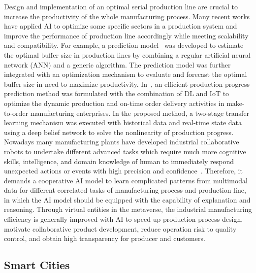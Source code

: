 \documentclass[journal]{IEEEtran}
\begin{document}
Design and implementation of an optimal serial production line are crucial to increase the productivity of the whole manufacturing process. Many recent works have applied AI to optimize some specific sectors in a production system and improve the performance of production line accordingly while meeting scalability and compatibility.
For example, a prediction model~\cite{alkhalefah2021development} was developed to estimate the optimal buffer size in production lines by combining a regular artificial neural network (ANN) and a generic algorithm. The prediction model was further integrated with an optimization mechanism to evaluate and forecast the optimal buffer size in need to maximize productivity. 
In~\cite{huang2019twostage}, an efficient production progress prediction method was formulated with the combination of DL and IoT to optimize the dynamic production and on-time order delivery activities in make-to-order manufacturing enterprises. In the proposed method, a two-stage transfer learning mechanism was executed with historical data and real-time state data using a deep belief network to solve the nonlinearity of production progress.
Nowadays many manufacturing plants have developed industrial collaborative robots to undertake different advanced tasks which require much more cognitive skills, intelligence, and domain knowledge of human to immediately respond unexpected actions or events with high precision and confidence~\cite{lins2021cooperative}.
Therefore, it demands a cooperative AI model to learn complicated patterns from multimodal data for different correlated tasks of manufacturing process and production line, in which the AI model should be equipped with the capability of explanation and reasoning.
Through virtual entities in the metaverse, the industrial manufacturing efficiency is generally improved with AI to speed up production process design, motivate collaborative product development, reduce operation risk to quality control, and obtain high transparency for producer and customers.

\subsection{Smart Cities}
\end{document}
